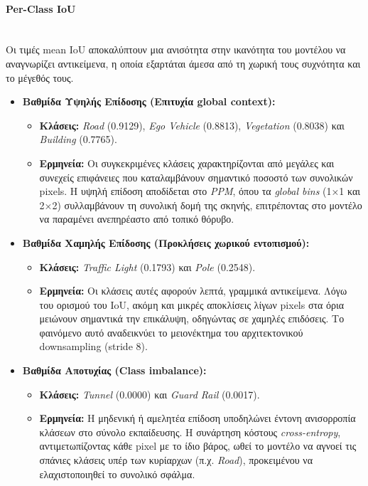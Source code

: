 \documentclass[12pt]{article}
\begin{document}
\paragraph{Per-Class IoU}
\mbox{}\\
Οι τιμές mean IoU αποκαλύπτουν μια ανισότητα στην ικανότητα του μοντέλου να αναγνωρίζει αντικείμενα, η οποία εξαρτάται άμεσα από τη χωρική τους συχνότητα και το μέγεθός τους.
\begin{itemize}
    \item \textbf{Βαθμίδα Υψηλής Επίδοσης (Επιτυχία global context):}
    \begin{itemize}
        \item \textbf{Κλάσεις:} \textit{Road} (0.9129), \textit{Ego Vehicle} (0.8813), \textit{Vegetation} (0.8038) και \textit{Building} (0.7765).
        \item \textbf{Ερμηνεία:} Οι συγκεκριμένες κλάσεις χαρακτηρίζονται από μεγάλες και συνεχείς επιφάνειες που καταλαμβάνουν σημαντικό ποσοστό των συνολικών pixels. Η υψηλή επίδοση αποδίδεται στο \textit{PPM}, όπου τα \textit{global bins} (1×1 και 2×2) συλλαμβάνουν τη συνολική δομή της σκηνής, επιτρέποντας στο μοντέλο να παραμένει ανεπηρέαστο από τοπικό θόρυβο.
    \end{itemize}

    \item \textbf{Βαθμίδα Χαμηλής Επίδοσης (Προκλήσεις χωρικού εντοπισμού):}
    \begin{itemize}
        \item \textbf{Κλάσεις:} \textit{Traffic Light} (0.1793) και \textit{Pole} (0.2548).
        \item \textbf{Ερμηνεία:} Οι κλάσεις αυτές αφορούν λεπτά, γραμμικά αντικείμενα. Λόγω του ορισμού του IoU, ακόμη και μικρές αποκλίσεις λίγων pixels στα όρια μειώνουν σημαντικά την επικάλυψη, οδηγώντας σε χαμηλές επιδόσεις. Το φαινόμενο αυτό αναδεικνύει το μειονέκτημα του αρχιτεκτονικού downsampling (stride 8).
    \end{itemize}

    \item \textbf{Βαθμίδα Αποτυχίας (Class imbalance):}
    \begin{itemize}
        \item \textbf{Κλάσεις:} \textit{Tunnel} (0.0000) και \textit{Guard Rail} (0.0017).
        \item \textbf{Ερμηνεία:} Η μηδενική ή αμελητέα επίδοση υποδηλώνει έντονη ανισορροπία κλάσεων στο σύνολο εκπαίδευσης. Η συνάρτηση κόστους \textit{cross-entropy}, αντιμετωπίζοντας κάθε pixel με το ίδιο βάρος, ωθεί το μοντέλο να αγνοεί τις σπάνιες κλάσεις υπέρ των κυρίαρχων (π.χ. \textit{Road}), προκειμένου να ελαχιστοποιηθεί το συνολικό σφάλμα.
    \end{itemize}
\end{itemize}
\end{document}
